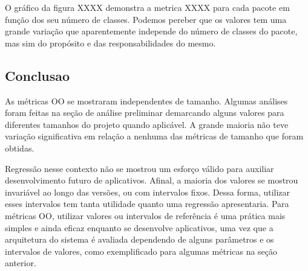 O gráfico da figura XXXX demonstra a metrica XXXX para cada pacote em função dos seu número de classes. Podemos pereber que os valores tem uma grande variação que aparentemente independe do número de classes do pacote, mas sim do propósito e das responsabilidades do mesmo.

\subsection{Conclusao}

As métricas OO se mostraram independentes de tamanho. Algumas análises foram feitas na seção de análise preliminar demarcando alguns valores para diferentes tamanhos do projeto quando aplicável. A grande maioria não teve variação significativa em relação a nenhuma das métricas de tamanho que foram obtidas.

Regressão nesse contexto não se mostrou um esforço válido para auxiliar desenvolvimento futuro de aplicativos. Afinal, a maioria dos valores se mostrou invariável ao longo das versões, ou com intervalos fixos. Dessa forma, utilizar esses intervalos tem tanta utilidade quanto uma regressão apresentaria. Para métricas OO, utilizar valores ou intervalos de referência é uma prática mais simples e ainda eficaz enquanto se desenvolve aplicativos, uma vez que a arquitetura do sistema é avaliada dependendo de alguns parâmetros e os intervalos de valores, como exemplificado para algumas métricas na seção anterior.
